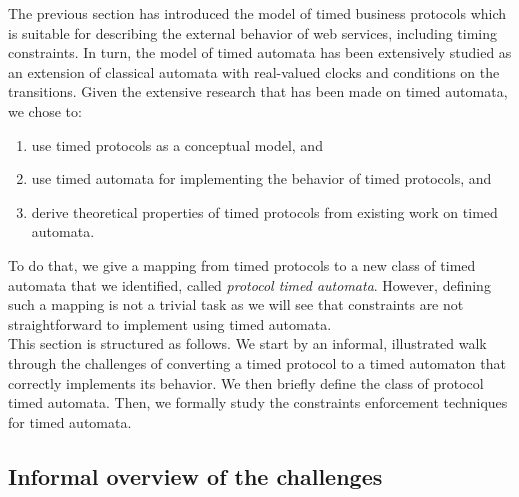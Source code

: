 The previous section has introduced the model of timed business protocols which is suitable for describing the external behavior of web services, including timing constraints. In turn, the model of timed automata \cite{RADLD94} has been extensively studied as an extension of classical automata \cite{Hopcroft79} with real-valued clocks and conditions on the transitions. Given the extensive research that has been made on timed automata, we chose to:
\begin{enumerate}
  
  \item use timed protocols as a conceptual model, and
  
  \item use timed automata for implementing the behavior of timed protocols, and
  
  \item derive theoretical properties of timed protocols from existing work on timed automata.
  
\end{enumerate}
To do that, we give a mapping from timed protocols to a new class of timed automata that we identified, called \emph{protocol timed automata}. However, defining such a mapping is not a trivial task as we will see that \MInvoke constraints are not straightforward to implement using timed automata.\\  

This section is structured as follows. We start by an informal, illustrated walk through the challenges of converting a timed protocol to a timed automaton that correctly implements its behavior. We then briefly define the class of protocol timed automata. Then, we formally study the \MInvoke constraints enforcement techniques for timed automata.


\subsection{Informal overview of the challenges}


